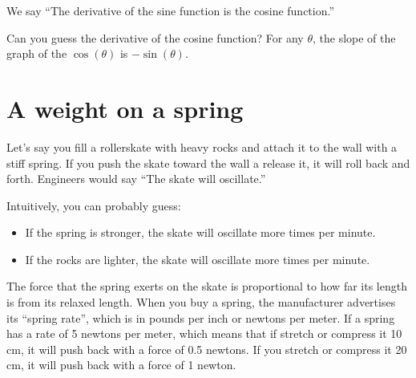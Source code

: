 
We say ``The derivative of the sine function is the cosine function.''

Can you guess the derivative of the cosine function? For any $\theta$, the slope of the graph of the $\cos(\theta)$ is $-\sin(\theta)$.



\section{A weight on a spring}

Let's say you fill a rollerskate with heavy rocks and attach it to the
wall with a stiff spring.  If you push the skate toward the wall a
release it, it will roll back and forth. Engineers would say ``The skate will oscillate.''

Intuitively, you can probably guess:
\begin{itemize}
\item If the spring is stronger, the skate will oscillate more times per minute.
\item If the rocks are lighter, the skate will oscillate more times per minute.
\end{itemize}

The force that the spring exerts on the skate is proportional to how
far its length is from its relaxed length. When you buy a spring, the
manufacturer advertises its ``spring rate'', which is in pounds per
inch or newtons per meter.  If a spring has a rate of 5 newtons per
meter, which means that if stretch or compress it 10 cm, it will push
back with a force of 0.5 newtons. If you stretch or compress it 20 cm,
it will push back with a force of 1 newton.

